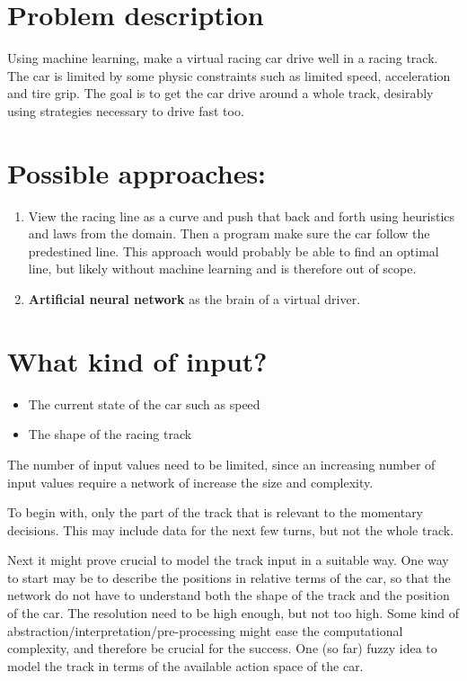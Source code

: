


\section{Problem description}
Using machine learning, make a virtual racing car drive well in a racing track. The car is limited by some physic constraints such as limited speed, acceleration and tire grip. The goal is to get the car drive around a whole track, desirably using strategies necessary to drive fast too.




\section{Possible approaches:}
\begin{enumerate}
    \item View the racing line as a curve and push that back and forth using heuristics and laws from the domain. Then a program make sure the car follow the predestined line. This approach would probably be able to find an optimal line, but likely without machine learning and is therefore out of scope.
    \item \textbf{Artificial neural network} as the brain of a virtual driver.
\end{enumerate}



\section{What kind of input?}
\begin{itemize}
    \item The current state of the car such as speed
    \item The shape of the racing track
\end{itemize}
The number of input values need to be limited, since an increasing number of input values require a network of increase the size and complexity. 

To begin with, only the part of the track that is relevant to the momentary decisions. This may include data for the next few turns, but not the whole track.

Next it might prove crucial to model the track input in a suitable way. One way to start may be to describe the positions in relative terms of the car, so that the network do not have to understand both the shape of the track and the position of the car. The resolution need to be high enough, but not too high. Some kind of abstraction/interpretation/pre-processing might ease the computational complexity, and therefore be crucial for the success. One (so far) fuzzy idea to model the track in terms of the available action space of the car. 




